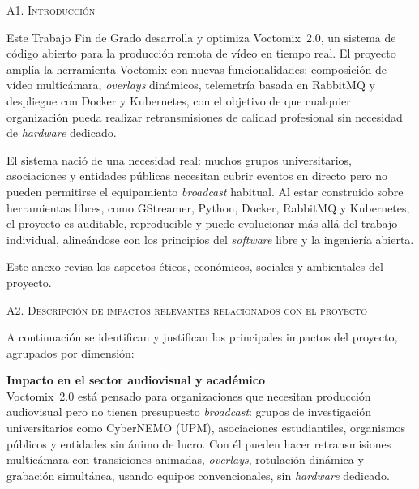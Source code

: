 
\vspace{0cm}

\Large{\textsc{\textcolor{nar}{A1. Introducción}}}
\vspace{0.2cm}

\normalsize{Este Trabajo Fin de Grado desarrolla y optimiza Voctomix~2.0, un sistema de código
abierto para la producción remota de vídeo en tiempo real. El proyecto amplía la herramienta
Voctomix con nuevas funcionalidades: composición de vídeo multicámara, \textit{overlays} dinámicos,
telemetría basada en RabbitMQ y despliegue con Docker y Kubernetes, con el objetivo de que
cualquier organización pueda realizar retransmisiones de calidad profesional sin necesidad de
\textit{hardware} dedicado.

El sistema nació de una necesidad real: muchos grupos universitarios, asociaciones y entidades
públicas necesitan cubrir eventos en directo pero no pueden permitirse el equipamiento \textit{broadcast}
habitual. Al estar construido sobre herramientas libres, como GStreamer, Python, Docker, RabbitMQ
y Kubernetes, el proyecto es auditable, reproducible y puede evolucionar más allá del trabajo
individual, alineándose con los principios del \textit{software} libre y la ingeniería abierta.

Este anexo revisa los aspectos éticos, económicos, sociales y ambientales del proyecto.}
\vspace{0.3cm}

\Large{\textsc{\textcolor{nar}{A2. Descripción de impactos relevantes relacionados con el proyecto}}}
\vspace{0.2cm}

\normalsize{A continuación se identifican y justifican los principales impactos del proyecto,
agrupados por dimensión:}

\vspace{0.15cm}
\noindent\textbf{Impacto en el sector audiovisual y académico}\\
\normalsize{Voctomix~2.0 está pensado para organizaciones que necesitan producción audiovisual pero
no tienen presupuesto \textit{broadcast}: grupos de investigación universitarios como CyberNEMO (UPM),
asociaciones estudiantiles, organismos públicos y entidades sin ánimo de lucro. Con él pueden
hacer retransmisiones multicámara con transiciones animadas, \textit{overlays}, rotulación dinámica y
grabación simultánea, usando equipos convencionales, sin \textit{hardware} dedicado.}

